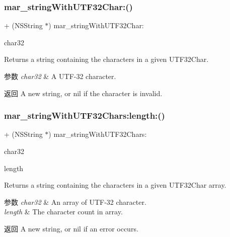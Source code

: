 \subsubsection{\texorpdfstring{mar\+\_\+string\+With\+U\+T\+F32\+Char\+:()}{mar\_stringWithUTF32Char:()}}
{\footnotesize\ttfamily + (N\+S\+String $\ast$) mar\+\_\+string\+With\+U\+T\+F32\+Char\+: \begin{DoxyParamCaption}\item[{(U\+T\+F32\+Char)}]{char32 }\end{DoxyParamCaption}}

Returns a string containing the characters in a given U\+T\+F32\+Char.


\begin{DoxyParams}{参数}
{\em char32} & A U\+T\+F-\/32 character. \\
\hline
\end{DoxyParams}
\begin{DoxyReturn}{返回}
A new string, or nil if the character is invalid. 
\end{DoxyReturn}
\mbox{\label{category_n_s_string_07_m_a_r_e_x_08_acc299109ecfb2f44dedabaaf84249a5b}} 
\subsubsection{\texorpdfstring{mar\+\_\+string\+With\+U\+T\+F32\+Chars\+:length\+:()}{mar\_stringWithUTF32Chars:length:()}}
{\footnotesize\ttfamily + (N\+S\+String $\ast$) mar\+\_\+string\+With\+U\+T\+F32\+Chars\+: \begin{DoxyParamCaption}\item[{(const U\+T\+F32\+Char $\ast$)}]{char32 }\item[{length:(N\+S\+U\+Integer)}]{length }\end{DoxyParamCaption}}

Returns a string containing the characters in a given U\+T\+F32\+Char array.


\begin{DoxyParams}{参数}
{\em char32} & An array of U\+T\+F-\/32 character. \\
\hline
{\em length} & The character count in array. \\
\hline
\end{DoxyParams}
\begin{DoxyReturn}{返回}
A new string, or nil if an error occurs. 
\end{DoxyReturn}
\mbox{\label{category_n_s_string_07_m_a_r_e_x_08_a8b496142ddde54881c5a2df2b3f31b99}} 

